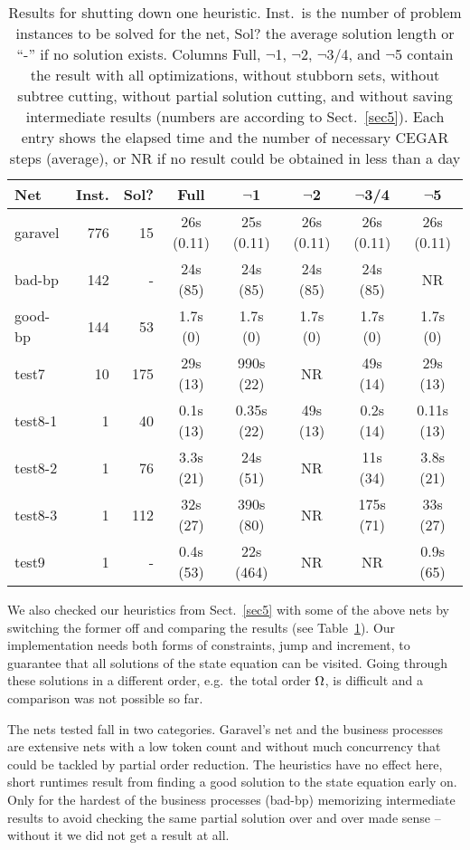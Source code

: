 \documentclass{LMCS}
\begin{document}
\begin{table}[tb]
\centering\small
\begin{tabular}{|l|r|r|c|c|c|c|c|}\hline
Net & Inst. & Sol? & Full & $\neg$1 & $\neg$2 & $\neg$3/4 & $\neg$5\\\hline
garavel & 776 & 15 & 26s (0.11) & 25s (0.11) & 26s (0.11) & 26s (0.11) & 26s (0.11)\\\hline
bad-bp & 142 & - & 24s (85) & 24s (85) & 24s (85) & 24s (85) & NR\\\hline
good-bp & 144 & 53 & 1.7s (0) & 1.7s (0) & 1.7s (0) & 1.7s (0) & 1.7s (0)\\\hline
test7 & 10 & 175 & 29s (13) & 990s (22) & NR & 49s (14) & 29s (13)\\\hline
test8-1 & 1 & 40 & 0.1s (13) & 0.35s (22) & 49s (13) & 0.2s (14) & 0.11s (13)\\\hline
test8-2 & 1 & 76 & 3.3s (21) & 24s (51) & NR & 11s (34) & 3.8s (21)\\\hline
test8-3 & 1 & 112 & 32s (27) & 390s (80) & NR & 175s (71) & 33s (27)\\\hline
test9 & 1 & - & 0.4s (53) & 22s (464) & NR & NR & 0.9s (65)\\\hline
\end{tabular}\vspace*{2mm}
\caption{\label{t.1}Results for shutting down one heuristic. Inst.\ is the number of problem
instances to be solved for the net, Sol? the average solution length or ``-'' if no solution
exists. Columns Full, $\neg$1, $\neg$2, $\neg$3/4, and $\neg$5 contain the result
with all optimizations, without stubborn sets, without
subtree cutting, without partial solution cutting, and without saving intermediate results 
(numbers are according to Sect.~\ref{sec5}).
Each entry shows the elapsed time and the number of necessary CEGAR steps (average), or
NR if no result could be obtained in less than a day}
\end{table}

We also checked our heuristics from Sect.~\ref{sec5} with some of the above nets by switching
the former off and comparing the results (see Table~\ref{t.1}). Our implementation needs both forms of constraints,
jump and increment, to guarantee that all solutions of the state equation can be visited.
Going through these solutions in a different order, e.g.\ the total order $\Omega$, is difficult
and a comparison was not possible so far.

The nets tested fall in two categories. Garavel's net 
and the business processes are extensive nets with a low token count and without much
concurrency that could be tackled by partial order reduction. The heuristics have no effect
here, short runtimes result from finding a good solution to the state equation early on.
Only for the hardest of the business processes (bad-bp) memorizing intermediate results
to avoid checking the same partial solution over and over made sense -- without it we did not get
a result at all.
\end{document}
